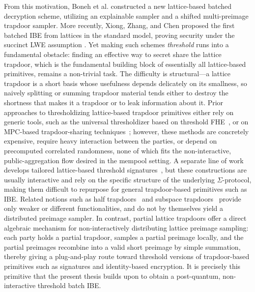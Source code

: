 From this motivation, Boneh et al. \cite{EPRINT:BonLauTas25} constructed a new lattice-based batched decryption scheme, utilizing an explainable sampler and a shifted multi-preimage trapdoor sampler. More recently, Xiong, Zhang, and Chen proposed the first batched IBE from lattices in the standard model, proving security under the succinct LWE assumption \cite{EPRINT:XioChe25}. Yet making such schemes \emph{threshold} runs into a fundamental obstacle: finding an effective way to secret share the lattice trapdoor, which is the fundamental building block of essentially all lattice-based primitives, remains a non-trivial task. The difficulty is structural—a lattice trapdoor is a short basis whose usefulness depends delicately on its smallness, so naively splitting or summing trapdoor material tends either to destroy the shortness that makes it a trapdoor or to leak information about it. Prior approaches to thresholdizing lattice-based trapdoor primitives either rely on generic tools, such as the universal thresholdizer based on threshold FHE~\cite{BGG+18,ASY22}, or on MPC-based trapdoor-sharing techniques~\cite{BKP13}; however, these methods are concretely expensive, require heavy interaction between the parties, or depend on precomputed correlated randomness, none of which fits the non-interactive, public-aggregation flow desired in the mempool setting. A separate line of work develops tailored lattice-based threshold signatures~\cite{GKS24,DKM+24,EKT24,BKL+25}, but these constructions are usually interactive and rely on the specific structure of the underlying $\Sigma$-protocol, making them difficult to repurpose for general trapdoor-based primitives such as IBE. Related notions such as half trapdoors~\cite{Wee21} and subspace trapdoors~\cite{PT24} provide only weaker or different functionalities, and do not by themselves yield a distributed preimage sampler. In contrast, partial lattice trapdoors offer a direct algebraic mechanism for non-interactively distributing lattice preimage sampling: each party holds a partial trapdoor, samples a partial preimage locally, and the partial preimages recombine into a valid short preimage by simple summation, thereby giving a plug-and-play route toward threshold versions of trapdoor-based primitives such as signatures and identity-based encryption. It is precisely this primitive that the present thesis builds upon to obtain a post-quantum, non-interactive threshold batch IBE.




